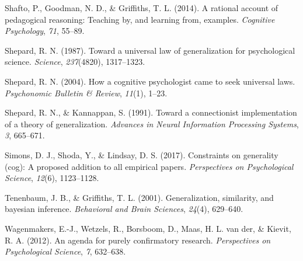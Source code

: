 \documentclass[
  english,
  doc]{apa6}
\begin{document}
\leavevmode\hypertarget{ref-shafto2014rational}{}%
Shafto, P., Goodman, N. D., \& Griffiths, T. L. (2014). A rational account of pedagogical reasoning: Teaching by, and learning from, examples. \emph{Cognitive Psychology}, \emph{71}, 55--89.

\leavevmode\hypertarget{ref-shepard1987toward}{}%
Shepard, R. N. (1987). Toward a universal law of generalization for psychological science. \emph{Science}, \emph{237}(4820), 1317--1323.

\leavevmode\hypertarget{ref-shepard2004cognitive}{}%
Shepard, R. N. (2004). How a cognitive psychologist came to seek universal laws. \emph{Psychonomic Bulletin \& Review}, \emph{11}(1), 1--23.

\leavevmode\hypertarget{ref-shepard1991toward}{}%
Shepard, R. N., \& Kannappan, S. (1991). Toward a connectionist implementation of a theory of generalization. \emph{Advances in Neural Information Processing Systems}, \emph{3}, 665--671.

\leavevmode\hypertarget{ref-simons2017constraints}{}%
Simons, D. J., Shoda, Y., \& Lindsay, D. S. (2017). Constraints on generality (cog): A proposed addition to all empirical papers. \emph{Perspectives on Psychological Science}, \emph{12}(6), 1123--1128.

\leavevmode\hypertarget{ref-tenenbaum2001generalization}{}%
Tenenbaum, J. B., \& Griffiths, T. L. (2001). Generalization, similarity, and bayesian inference. \emph{Behavioral and Brain Sciences}, \emph{24}(4), 629--640.

\leavevmode\hypertarget{ref-Wagenmakers2012}{}%
Wagenmakers, E.-J., Wetzels, R., Borsboom, D., Maas, H. L. van der, \& Kievit, R. A. (2012). An agenda for purely confirmatory research. \emph{Perspectives on Psychological Science}, \emph{7}, 632--638.
\end{document}
